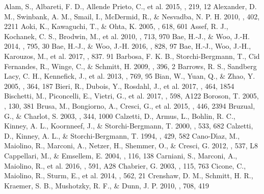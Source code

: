 \documentclass[twocolumn]{aastex6}
\begin{document}
\begin{thebibliography}{}
Alam, S., Albareti, F. D., Allende Prieto, C., et al. 2015, \apjs, 219, 12
Alexander, D. M., Swinbank, A. M., Smail, I., McDermid, R., \& Nesvadba, N. P. H. 2010, \mnras, 402, 2211
Aoki, K., Kawaguchi, T., \& Ohta, K. 2005, \apj, 618, 601
Assef, R. J., Kochanek, C. S., Brodwin, M., et al. 2010, \apj, 713, 970
Bae, H.-J., \& Woo, J.-H. 2014, \apj, 795, 30
Bae, H.-J., \& Woo, J.-H. 2016, \apj, 828, 97
Bae, H.-J., Woo, J.-H., Karouzos, M., et al. 2017, \apj, 837. 91
Barbosa, F. K. B., Storchi-Bergmann, T., Cid Fernandes, R., Winge, C., \& Schmitt, H. 2009, \mnras, 396, 2
Barrows, R. S., Sandberg Lacy, C. H., Kennefick, J., et al. 2013, \apj, 769, 95
Bian, W., Yuan, Q., \& Zhao, Y. 2005, \mnras, 364, 187
Bieri, R., Dubois, Y., Rosdahl, J., et al. 2017, \mnras, 464, 1854
Bischetti, M., Piconcelli, E., Vietri, G., et al. 2017, \aap, 598, A122
Boroson, T. 2005, \aj, 130, 381
Brusa, M., Bongiorno, A., Cresci, G., et al. 2015, \mnras, 446, 2394
Bruzual, G., \& Charlot, S. 2003, \mnras, 344, 1000
Calzetti, D., Armus, L., Bohlin, R. C., Kinney, A. L., Koornneef, J., \& Storchi-Bergmann, T. 2000, \apj, 533, 682
Calzetti, D., Kinney, A. L., \& Storchi-Bergmann, T. 1994, \apj, 429, 582
Cano-D\'{\i}az, M., Maiolino, R., Marconi, A., Netzer, H., Shemmer, O., \& Cresci, G. 2012, \aap, 537, L8
Cappellari, M., \& Emsellem, E. 2004, \pasp, 116, 138
Carniani, S., Marconi, A., Maiolino, R., et al. 2016, \aap, 591, A28
Chabrier, G. 2003, \pasp, 115, 763
Cicone, C., Maiolino, R., Sturm, E., et al. 2014, \aap, 562, 21
Crenshaw, D. M., Schmitt, H. R., Kraemer, S. B., Mushotzky, R. F., \& Dunn, J. P. 2010, \apj, 708, 419

\end{thebibliography}
\end{document}
